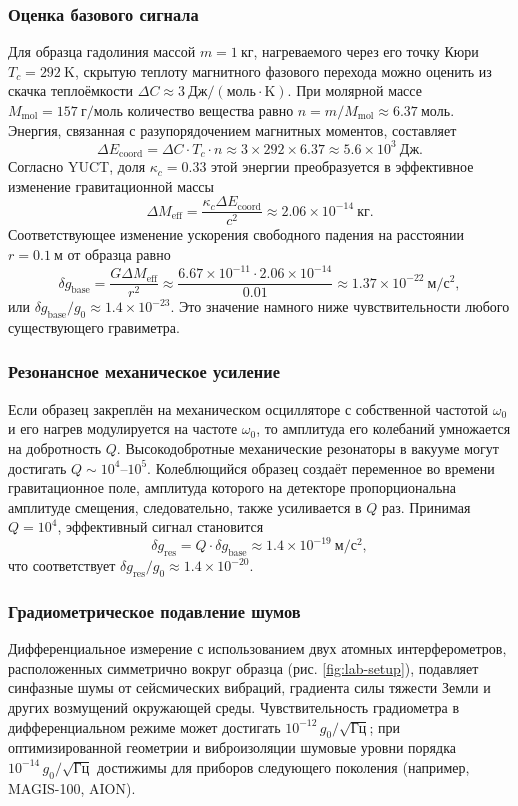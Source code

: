 \documentclass[12pt]{article}
\theoremstyle{remark}
\begin{document}
	\subsubsection{Оценка базового сигнала}
	Для образца гадолиния массой \(m = 1\ \mathrm{кг}\), нагреваемого через его точку Кюри \(T_c = 292\ \mathrm{K}\), скрытую теплоту магнитного фазового перехода можно оценить из скачка теплоёмкости \(\Delta C \approx 3\ \mathrm{Дж/(моль\cdot K)}\). При молярной массе \(M_{\mathrm{mol}} = 157\ \mathrm{г/моль}\) количество вещества равно \(n = m / M_{\mathrm{mol}} \approx 6.37\ \mathrm{моль}\). Энергия, связанная с разупорядочением магнитных моментов, составляет
	\[
	\Delta E_{\mathrm{coord}} = \Delta C \cdot T_c \cdot n \approx 3 \times 292 \times 6.37 \approx 5.6\times10^{3}\ \mathrm{Дж}.
	\]
	Согласно YUCT, доля \(\kappa_c = 0.33\) этой энергии преобразуется в эффективное изменение гравитационной массы
	\[
	\Delta M_{\mathrm{eff}} = \frac{\kappa_c \Delta E_{\mathrm{coord}}}{c^2} \approx 2.06\times10^{-14}\ \mathrm{кг}.
	\]
	Соответствующее изменение ускорения свободного падения на расстоянии \(r = 0.1\ \mathrm{м}\) от образца равно
	\[
	\delta g_{\mathrm{base}} = \frac{G \Delta M_{\mathrm{eff}}}{r^2} \approx \frac{6.67\times10^{-11} \cdot 2.06\times10^{-14}}{0.01} \approx 1.37\times10^{-22}\ \mathrm{м/с^2},
	\]
	или \(\delta g_{\mathrm{base}}/g_0 \approx 1.4\times10^{-23}\). Это значение намного ниже чувствительности любого существующего гравиметра.
	
	\subsubsection{Резонансное механическое усиление}
	Если образец закреплён на механическом осцилляторе с собственной частотой \(\omega_0\) и его нагрев модулируется на частоте \(\omega_0\), то амплитуда его колебаний умножается на добротность \(Q\). Высокодобротные механические резонаторы в вакууме могут достигать \(Q \sim 10^4\)–\(10^5\). Колеблющийся образец создаёт переменное во времени гравитационное поле, амплитуда которого на детекторе пропорциональна амплитуде смещения, следовательно, также усиливается в \(Q\) раз. Принимая \(Q = 10^4\), эффективный сигнал становится
	\[
	\delta g_{\mathrm{res}} = Q \cdot \delta g_{\mathrm{base}} \approx 1.4\times10^{-19}\ \mathrm{м/с^2},
	\]
	что соответствует \(\delta g_{\mathrm{res}}/g_0 \approx 1.4\times10^{-20}\).
	
	\subsubsection{Градиометрическое подавление шумов}
	Дифференциальное измерение с использованием двух атомных интерферометров, расположенных симметрично вокруг образца (рис. \ref{fig:lab-setup}), подавляет синфазные шумы от сейсмических вибраций, градиента силы тяжести Земли и других возмущений окружающей среды. Чувствительность градиометра в дифференциальном режиме может достигать \(10^{-12}\,g_0/\sqrt{\mathrm{Гц}}\); при оптимизированной геометрии и виброизоляции шумовые уровни порядка \(10^{-14}\,g_0/\sqrt{\mathrm{Гц}}\) достижимы для приборов следующего поколения (например, MAGIS-100, AION).
	
\end{document}
